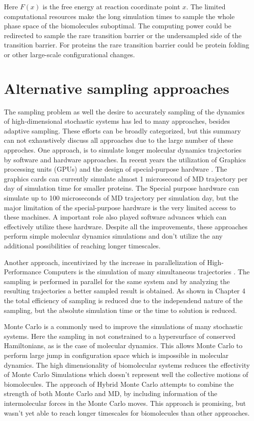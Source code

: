 Here $F(x)$ is the free energy at reaction coordinate point $x$. The limited computational resources make the long simulation times to sample the whole phase space of the biomolecules suboptimal. The computing power could be redirected to sample the rare transition barrier or the undersampled side of the transition barrier. For proteins the rare transition barrier could be protein folding or other large-scale configurational changes.


\section{\label{sec:intro2}Alternative sampling approaches}

The sampling problem as well the desire to accurately sampling of the dynamics of high-dimensional stochastic systems has led to many approaches, besides adaptive sampling.
These efforts can be broadly categorized, but this summary can not exhaustively discuss all approaches due to the large number of these approches.
One approach, is to simulate longer molecular dynamics trajectories by software and hardware approaches. In recent years the utilization of Graphics processing units (GPUs) and the design of special-purpose hardware \cite{shaw2014anton}. The graphics cards can currently simulate almost 1 microsecond of MD trajectory per day of simulation time for smaller proteins. The Special purpose hardware can simulate up to 100 microseconds of MD trajectory per simulation day, but the major limitation of the special-purpose hardware is the very limited access to these machines. A important role also played software advances which can effectively utilize these hardware. Despite all the improvements, these approaches perform simple molecular dynamics simulations and don't utilize the any additional possibilities of reaching longer timescales.

Another approach, incentivized by the increase in parallelization of High-Performance Computers is the simulation of many simultaneous trajectories \cite{DistComp-Shirts2000, DistComp-Buch2010}. The sampling is performed in parallel for the same system and by analyzing the resulting trajectories a better sampled result is obtained.  As shown in Chapter 4 the total efficiency of sampling is reduced due to the independend nature of the sampling, but the absolute simulation time or the time to solution is reduced.

Monte Carlo is a commonly used to improve the simulations of many stochastic systems. Here the sampling in not constrained to a hypersurface of conserved Hamiltonians, as is the case of molecular dynamics. This allows Monte Carlo to perform large jump in configuration space which is impossible in molecular dynamics. The high dimensionality of biomolecular systems reduces the effectivity of Monte Carlo Simulations which doesn't represent well the collective motions of biomolecules. The approach of Hybrid Monte Carlo attempts to combine the strength of both Monte Carlo and MD, by including information of the intermolecular forces in the Monte Carlo moves. This approach is promising, but wasn't yet able to reach longer timescales for biomolecules than other approaches. 


